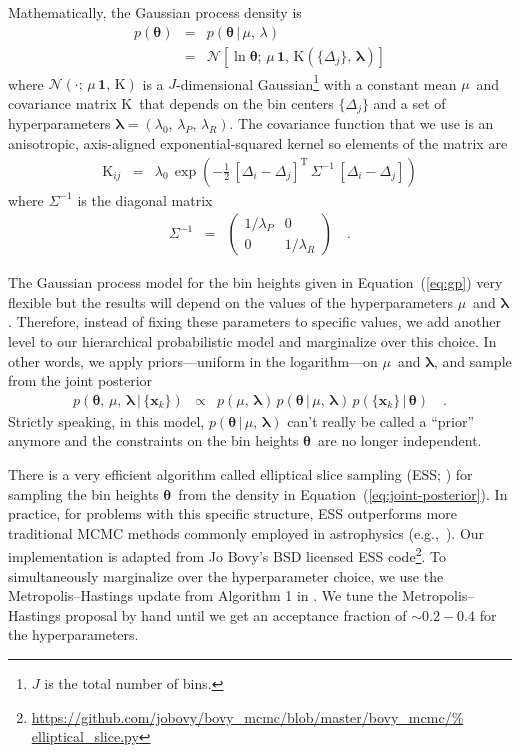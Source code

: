 \documentclass[12pt,preprint]{aastex}
\newcommand{\Eq}[1]{Equation~(\ref{eq:#1})}
\newcommand{\eq}[1]{\Eq{#1}}
\newcommand{\eqlabel}[1]{\label{eq:#1}}
\newcommand{\bvec}[1]{\ensuremath{\boldsymbol{#1}}}
\newcommand{\ratepar}{{\ensuremath{\theta}}}
\newcommand{\ratepars}{{\ensuremath{\bvec{\ratepar}}}}
\newcommand{\radius}{\ensuremath{R}}
\newcommand{\period}{\ensuremath{P}}
\newcommand{\data}{{\ensuremath{\bvec{x}}}}
\newcommand{\binarea}{{\ensuremath{\Delta}}}
\newcommand{\mean}{{\ensuremath{\mu}}}
\newcommand{\smooth}{{\ensuremath{\lambda}}}
\newcommand{\smoothpars}{{\ensuremath{\bvec{\smooth}}}}
\newcommand{\cov}{{\ensuremath{\mathrm{K}}}}
\begin{document}
Mathematically, the Gaussian process density is
\begin{eqnarray}
p(\ratepars) &=& p(\ratepars\,|\,\mean,\,\smooth) \nonumber\\
&=& \mathcal{N} \left[\ln\ratepars;\,\mean\,\bvec{1},\,
\cov(\{\binarea_j\},\,\smoothpars)\right]
\eqlabel{gp}
\end{eqnarray}
where $\mathcal{N}(\cdot;\,\mean\,\bvec{1},\,\cov)$ is a $J$-dimensional
Gaussian\footnote{$J$ is the total number of bins.} with a constant mean
\mean\ and covariance matrix \cov\ that depends on the bin centers
$\{\binarea_j\}$ and a set of hyperparameters $\smoothpars = (\smooth_0,\,
\smooth_\period,\,\smooth_\radius)$.
The covariance function that we use is an anisotropic, axis-aligned
exponential-squared kernel so elements of the matrix are
\begin{eqnarray}
\cov_{ij} &=& \smooth_0\,\exp\left(-\frac{1}{2}\,
    [\binarea_i-\binarea_j]^\mathrm{T}\,\Sigma^{-1}\,[\binarea_i-\binarea_j]
\right)
\end{eqnarray}
where $\Sigma^{-1}$ is the diagonal matrix
\begin{eqnarray}
\Sigma^{-1} &=& \left(\begin{array}{cc}
1/\smooth_\period & 0 \\
0 & 1/\smooth_\radius
\end{array}\right) \quad.
\end{eqnarray}

The Gaussian process model for the bin heights given in \eq{gp} very flexible
but the results will depend on the values of the hyperparameters \mean\ and
\smoothpars.
Therefore, instead of fixing these parameters to specific values, we add
another level to our hierarchical probabilistic model and marginalize over
this choice.
In other words, we apply priors---uniform in the logarithm---on \mean\ and
\smoothpars, and sample from the joint posterior
\begin{eqnarray} \eqlabel{joint-posterior}
p(\ratepars,\,\mean,\,\smoothpars\,|\,\{\data_k\}) &\propto&
    p(\mean,\,\smoothpars)\,p(\ratepars\,|\,\mean,\,\smoothpars)\,
    p(\{\data_k\}\,|\,\ratepars) \quad.
\end{eqnarray}
Strictly speaking, in this model, $p(\ratepars\,|\,\mean,\,\smoothpars)$ can't
really be called a ``prior'' anymore and the constraints on the bin heights
\ratepars\ are no longer independent.

There is a very efficient algorithm called elliptical slice sampling (ESS;
\citealt{ess, ess-hyper}) for sampling the bin heights \ratepars\ from the
density in \eq{joint-posterior}.
In practice, for problems with this specific structure, ESS outperforms more
traditional MCMC methods commonly employed in astrophysics
(e.g.,~\citealt{emcee}).
Our implementation is adapted from Jo Bovy's BSD licensed ESS
code\footnote{\url{https://github.com/jobovy/bovy_mcmc/blob/master/bovy_mcmc/%
elliptical_slice.py}}.
To simultaneously marginalize over the hyperparameter choice, we use the
Metropolis--Hastings update from Algorithm 1 in \citet{ess-hyper}.
We tune the Metropolis--Hastings proposal by hand until we get an acceptance
fraction of $\sim0.2-0.4$ for the hyperparameters.
\end{document}
